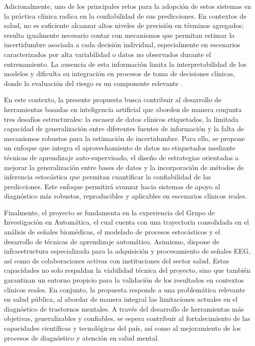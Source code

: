 
Adicionalmente, uno de los principales retos para la adopción de estos sistemas en la práctica clínica radica en la confiabilidad de sus predicciones. En contextos de salud, no es suficiente alcanzar altos niveles de precisión en términos agregados; resulta igualmente necesario contar con mecanismos que permitan estimar la incertidumbre asociada a cada decisión individual, especialmente en escenarios caracterizados por alta variabilidad o datos no observados durante el entrenamiento. La ausencia de esta información limita la interpretabilidad de los modelos y dificulta su integración en procesos de toma de decisiones clínicas, donde la evaluación del riesgo es un componente relevante \cite{Loftus2022}.

En este contexto, la presente propuesta busca contribuir al desarrollo de herramientas basadas en inteligencia artificial que aborden de manera conjunta tres desafíos estructurales: la escasez de datos clínicos etiquetados, la limitada capacidad de generalización entre diferentes fuentes de información y la falta de mecanismos robustos para la estimación de incertidumbre. Para ello, se propone un enfoque que integra el aprovechamiento de datos no etiquetados mediante técnicas de aprendizaje auto-supervisado, el diseño de estrategias orientadas a mejorar la generalización entre bases de datos y la incorporación de métodos de inferencia estocástica que permitan cuantificar la confiabilidad de las predicciones. Este enfoque permitirá avanzar hacia sistemas de apoyo al diagnóstico más robustos, reproducibles y aplicables en escenarios clínicos reales.

Finalmente, el proyecto se fundamenta en la experiencia del Grupo de Investigación en Automática, el cual cuenta con una trayectoria consolidada en el análisis de señales biomédicas, el modelado de procesos estocásticos y el desarrollo de técnicas de aprendizaje automático. Asimismo, dispone de infraestructura especializada para la adquisición y procesamiento de señales EEG, así como de colaboraciones activas con instituciones del sector salud. Estas capacidades no solo respaldan la viabilidad técnica del proyecto, sino que también garantizan un entorno propicio para la validación de los resultados en contextos clínicos reales. En conjunto, la propuesta responde a una problemática relevante en salud pública, al abordar de manera integral las limitaciones actuales en el diagnóstico de trastornos mentales. A través del desarrollo de herramientas más objetivas, generalizables y confiables, se espera contribuir al fortalecimiento de las capacidades científicas y tecnológicas del país, así como al mejoramiento de los procesos de diagnóstico y atención en salud mental.